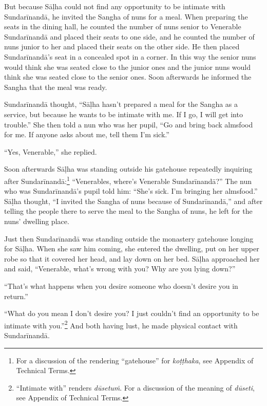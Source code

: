\documentclass[12pt,openany]{book}%
\begin{document}
But because \textsanskrit{Sāḷha} could not find any opportunity to be intimate with \textsanskrit{Sundarīnandā}, he invited the Sangha of nuns for a meal. When preparing the seats in the dining hall, he counted the number of nuns senior to Venerable \textsanskrit{Sundarīnandā} and placed their seats to one side, and he counted the number of nuns junior to her and placed their seats on the other side. He then placed \textsanskrit{Sundarīnandā}’s seat in a concealed spot in a corner. In this way the senior nuns would think she was seated close to the junior ones and the junior nuns would think she was seated close to the senior ones. Soon afterwards he informed the Sangha that the meal was ready. 

\textsanskrit{Sundarīnandā} thought, “\textsanskrit{Sāḷha} hasn’t prepared a meal for the Sangha as a service, but because he wants to be intimate with me. If I go, I will get into trouble.” She then told a nun who was her pupil, “Go and bring back almsfood for me. If anyone asks about me, tell them I’m sick.” 

“Yes, Venerable,” she replied. 

Soon afterwards \textsanskrit{Sāḷha} was standing outside his gatehouse repeatedly inquiring after \textsanskrit{Sundarīnandā}:\footnote{For a discussion of the rendering “gatehouse” for \textit{\textsanskrit{koṭṭhaka}}, see Appendix of Technical Terms. } “Venerables, where’s Venerable \textsanskrit{Sundarīnandā}?” The nun who was \textsanskrit{Sundarīnandā}’s pupil told him: “She’s sick. I’m bringing her almsfood.” \textsanskrit{Sāḷha} thought, “I invited the Sangha of nuns because of \textsanskrit{Sundarīnandā},” and after telling the people there to serve the meal to the Sangha of nuns, he left for the nuns’ dwelling place. 

Just then \textsanskrit{Sundarīnandā} was standing outside the monastery gatehouse longing for \textsanskrit{Sāḷha}. When she saw him coming, she entered the dwelling, put on her upper robe so that it covered her head, and lay down on her bed. \textsanskrit{Sāḷha} approached her and said, “Venerable, what’s wrong with you? Why are you lying down?” 

“That’s what happens when you desire someone who doesn’t desire you in return.” 

“What do you mean I don’t desire you? I just couldn’t find an opportunity to be intimate with you.”\footnote{“Intimate with” renders \textit{\textsanskrit{dūsetuṁ}}. For a discussion of the meaning of \textit{\textsanskrit{dūseti}}, see Appendix of Technical Terms. } And both having lust, he made physical contact with \textsanskrit{Sundarīnandā}. 
\end{document}
